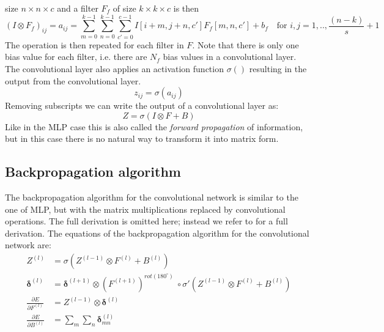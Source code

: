 size $n \times n \times c$ and a filter $F_f$ of size $k \times k \times c$ is
then
\begin{equation}
\label{eq:directconv}
(I \otimes F_f)_{ij} = a_{ij}  = \sum_{m=0}^{k-1}\sum_{n=0}^{k-1}
\sum_{c'=0}^{c-1} I[i+m, j+n, c'] F_f[m,n,c'] + b_f \quad \text{for } i,j =
1,.., \frac{(n-k)}{s} + 1 
\end{equation}
The operation is then repeated for each filter in $F$. Note that there is only
one bias value for each filter, i.e. there are $N_f$ bias values in a
convolutional layer. The convolutional layer also applies an activation function
$\sigma()$ resulting in the output from the convolutional layer.
\begin{equation}
z_{ij} = \sigma(a_{ij})
\end{equation}
Removing subscripts we can write the output of a convolutional layer as:
\begin{equation}
Z = \sigma\left( I \otimes F + B \right) 
\end{equation}
Like in the MLP case this is also called the \emph{forward propagation} of
information, but in this case there is no natural way to transform it into
matrix form. 

\subsection{Backpropagation algorithm}
The backpropagation algorithm  for the convolutional network is similar to the
one of MLP, but with the matrix multiplications replaced by convolutional
operations. The full derivation is omitted here; instead we refer to
\cite{DeepGrid} for a full derivation. The equations of the backpropagation
algorithm for the convolutional network are:
\begin{align}
\label{eq:forwardconv}
Z^{(l)} &= \sigma \left( Z^{(l-1)} \otimes F^{(l)} + B^{(l)}\right) \\
\label{eq:backwadconvdelta}
\boldsymbol{\delta}^{(l)} &= \boldsymbol{\delta}^{(l+1)} \otimes
\left(F^{(l+1)}\right)^{rot(180^\circ)} \ \circ \sigma' \left( Z^{(l-1)} \otimes
F^{(l)} + B^{(l)}  \right)  \\ 
\label{eq:backwadconv}
\frac{\partial E}{\partial F^{(l)}} &=  Z^{(l-1)} \otimes
\boldsymbol{\delta}^{(l)}  \\
\frac{\partial E}{\partial B^{(l)}} &= \sum_m \sum_n
\boldsymbol{\delta}^{(l)}_{mn}
\end{align}

